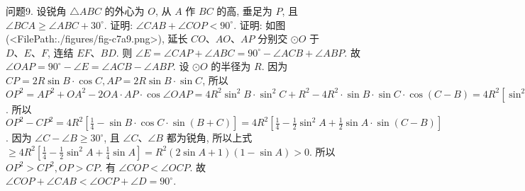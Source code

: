 问题9. 设锐角 $\triangle A B C$ 的外心为 $O$, 从 $A$ 作 $B C$ 的高, 垂足为 $P$, 且 $\angle B C A \geqslant \angle A B C+30^{\circ}$. 证明: $\angle C A B+\angle C O P<90^{\circ}$.
证明: 如图(<FilePath:./figures/fig-c7a9.png>), 延长 $C O 、 A O 、 A P$ 分别交 $\odot O$ 于 $D 、 E 、 F$, 连结 $E F 、 B D$. 则 $\angle E=\angle C A P+\angle A B C= 90^{\circ}-\angle A C B+\angle A B P$. 故 $\angle O A P=90^{\circ}-\angle E= \angle A C B-\angle A B P$. 设 $\odot O$ 的半径为 $R$. 因为 $C P= 2 R \sin B \cdot \cos C, A P=2 R \sin B \cdot \sin C$, 所以 $O P^2= A P^2+O A^2-2 O A \cdot A P \cdot \cos \angle O A P=4 R^2 \sin ^2 B \cdot \sin ^2 C+R^2-4 R^2 \cdot \sin B \cdot \sin C \cdot \cos (C-B)= 4 R^2\left[\sin ^2 B \cdot \sin ^2 C+\frac{1}{4}-\sin ^2 B \cdot \sin ^2 C-\sin B \cdot \cos B \cdot\right.\sin C \cdot \cos C]=4 R^2\left(\frac{1}{4}-\sin B \cdot \cos B \cdot \sin C \cdot \cos C\right)$. 所以 $O P^2- C P^2=4 R^2\left[\frac{1}{4}-\sin B \cdot \cos C \cdot \sin (B+C)\right]=4 R^2\left[\frac{1}{4}-\frac{1}{2} \sin ^2 A+\right.\left.\frac{1}{2} \sin A \cdot \sin (C-B)\right]$. 因为 $\angle C-\angle B \geqslant 30^{\circ}$, 且 $\angle C 、 \angle B$ 都为锐角, 所以上式 $\geqslant 4 R^2\left[\frac{1}{4}-\frac{1}{2} \sin ^2 A+\frac{1}{4} \sin A\right]=R^2(2 \sin A+1)(1-\sin A)>0$. 所以 $O P^2>C P^2, O P>C P$. 有 $\angle C O P<\angle O C P$. 故 $\angle C O P+\angle C A B< \angle O C P+\angle D=90^{\circ}$.



